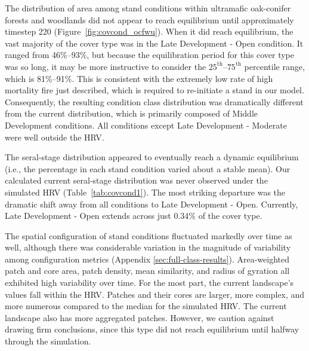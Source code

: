 The distribution of area among stand conditions within ultramafic oak-conifer forests and woodlands did not appear to reach equilibrium until approximately timestep 220 (Figure~\ref{fig:covcond_ocfwu}). When it did reach equilibrium, the vast majority of the cover type was in the Late Development - Open condition. It ranged from 46\%--93\%, but because the equilibration period for this cover type was so long, it may be more instructive to consider the $25^{\text{th}}$--$75^{\text{th}}$ percentile range, which is 81\%--91\%. This is consistent with the extremely low rate of high mortality fire just described, which is required to re-initiate a stand in our model. Consequently, the resulting condition class distribution was dramatically different from the current distribution, which is primarily composed of Middle Development conditions. All conditions except Late Development - Moderate were well outside the HRV.

The seral-stage distribution appeared to eventually reach a dynamic equilibrium (i.e., the percentage in each stand condition varied about a stable mean). Our calculated current seral-stage distribution was never observed under the simulated HRV (Table~\ref{tab:covcond1}). The most striking departure was the dramatic shift away from all conditions to Late Development - Open. Currently, Late Development - Open extends across just 0.34\% of the cover type. 

The spatial configuration of stand conditions fluctuated markedly over time as well, although there was considerable variation in the magnitude of variability among configuration metrics (Appendix \ref{sec:full-class-results}). Area-weighted patch and core area, patch density, mean similarity, and radius of gyration all exhibited high variability over time. For the most part, the current landscape's values fall within the HRV. Patches and their cores are larger, more complex, and more numerous compared to the median for the simulated HRV. The current landscape also has more aggregated patches. However, we caution against drawing firm conclusions, since this type did not reach equilibrium until halfway through the simulation.

